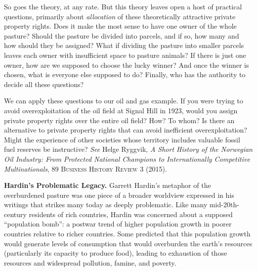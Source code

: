 So goes the theory, at any rate. But this theory leaves open a host of practical
questions, primarily about \textit{allocation} of these theoretically attractive
private property rights. Does it make the most sense to have one owner of the
whole pasture? Should the pasture be divided into parcels, and if so, how many
and how should they be assigned? What if dividing the pasture into smaller
parcels leaves each owner with insufficient space to pasture animals? If there
is just one owner, how are we supposed to choose the lucky winner? And once the
winner is chosen, what is everyone else supposed to do? Finally, who has the
authority to decide all these questions? 

We can apply these questions to our oil and gas example. If you were trying to
avoid overexploitation of the oil field at Signal Hill in 1923, would you assign
private property rights over the entire oil field? How? To whom? Is there an
alternative to private property rights that can avoid inefficient
overexploitation? Might the experience of other societies whose territory
includes valuable fossil fuel reserves be instructive? \textit{See} Helge
Ryggvik, \textit{A Short History of the Norwegian Oil Industry: From Protected
National Champions to Internationally Competitive Multinationals}, 89
\textsc{Business History Review} 3 (2015).


\item \textbf{Hardin's Problematic Legacy.} Garrett Hardin's metaphor of the
overburdened pasture was one piece of a broader worldview expressed in his
writings that strikes many today as deeply problematic. Like many
mid-20th{}-century residents of rich countries, Hardin was concerned about a
supposed ``population bomb'': a postwar trend of higher population growth in
poorer countries relative to richer countries. Some predicted that this
population growth would generate levels of consumption that would overburden the
earth's resources (particularly its capacity to produce food), leading to
exhaustion of those resources and widespread pollution, famine, and poverty.

